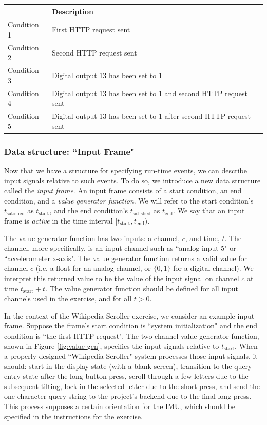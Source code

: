 \documentclass[12pt]{article}
\begin{document}
\begin{table}
\begin{center}
\begin{tabular}{l|l}
& Description \\ \hline
Condition 1 & First HTTP request sent \\
Condition 2 & Second HTTP request sent \\
Condition 3 & Digital output 13 has been set to 1 \\
Condition 4 & Digital output 13 has been set to 1 and second HTTP request sent \\
Condition 5 & Digital output 13 has been set to 1 after second HTTP request sent \\ \hline
\end{tabular}
\end{center}
\end{table}

\subsubsection{Data structure: ``Input Frame"}
Now that we have a structure for specifying run-time events, we can describe input signals relative to such events.  To do so, we introduce a new data structure called the \textit{input frame}.  An input frame consists of a start condition, an end condition, and a \textit{value generator function}.  We will refer to the start condition's $t_{\text{satisfied}}$ as $t_{\text{start}}$, and the end condition's $t_{\text{satisfied}}$ as $t_{\text{end}}$.  We say that an input frame is \textit{active} in the time interval $[t_{\text{start}}, t_{\text{end}})$.

The value generator function has two inputs: a channel, $c$, and time, $t$.  The channel, more specifically, is an input channel such as ``analog input 5" or ``accelerometer x-axis".  The value generator function returns a valid value for channel $c$ (i.e. a float for an analog channel, or $\{0,1\}$ for a digital channel).  We interpret this returned value to be the value of the input signal on channel $c$ at time $t_{\text{start}}+t$.  The value generator function should be defined for all input channels used in the exercise, and for all $t>0$.

In the context of the Wikipedia Scroller exercise, we consider an example input frame.  Suppose the frame's start condition is ``system initialization" and the end condition is ``the first HTTP request".  The two-channel value generator function, shown in Figure \ref{fig:value-gen}, specifies the input signals relative to $t_{\text{start}}$.  When a properly designed ``Wikipedia Scroller" system processes those input signals, it should: start in the display state (with a blank screen), transition to the query entry state after the long button press, scroll through a few letters due to the subsequent tilting, lock in the selected letter due to the short press, and send the one-character query string to the project's backend due to the final long press.  This process supposes a certain orientation for the IMU, which should be specified in the instructions for the exercise.
\end{document}
